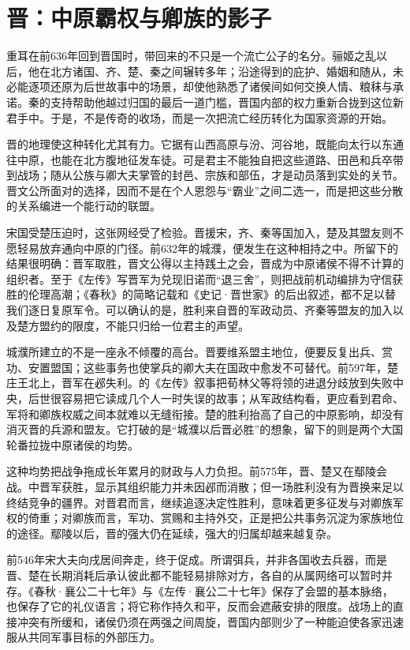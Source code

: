 \section{晋：中原霸权与卿族的影子}

重耳在前636年回到晋国时，带回来的不只是一个流亡公子的名分。骊姬之乱以后，他在北方诸国、齐、楚、秦之间辗转多年；沿途得到的庇护、婚姻和随从，未必能逐项还原为后世故事中的场景，却使他熟悉了诸侯间如何交换人情、粮秣与承诺。秦的支持帮助他越过归国的最后一道门槛，晋国内部的权力重新合拢到这位新君手中。于是，不是传奇的收场，而是一次把流亡经历转化为国家资源的开始。

晋的地理使这种转化尤其有力。它据有山西高原与汾、河谷地，既能向太行以东通往中原，也能在北方腹地征发车徒。可是君主不能独自把这些道路、田邑和兵卒带到战场；随从公族与卿大夫掌管的封邑、宗族和部伍，才是动员落到实处的关节。晋文公所面对的选择，因而不是在个人恩怨与“霸业”之间二选一，而是把这些分散的关系编进一个能行动的联盟。

宋国受楚压迫时，这张网经受了检验。晋援宋，齐、秦等国加入，楚及其盟友则不愿轻易放弃通向中原的门径。前632年的城濮，便发生在这种相持之中。所留下的结果很明确：晋军取胜，晋文公得以主持践土之会，晋成为中原诸侯不得不计算的组织者。至于《左传》写晋军为兑现旧诺而“退三舍”，则把战前机动编排为守信获胜的伦理高潮；《春秋》的简略记载和《史记·晋世家》的后出叙述，都不足以替我们逐日复原军令。可以确认的是，胜利来自晋的军政动员、齐秦等盟友的加入以及楚方盟约的限度，不能只归给一位君主的声望。

城濮所建立的不是一座永不倾覆的高台。晋要维系盟主地位，便要反复出兵、赏功、安置盟国；这些事务也使掌兵的卿大夫在国政中愈发不可替代。前597年，楚庄王北上，晋军在邲失利。的《左传》叙事把荀林父等将领的进退分歧放到失败中央，后世很容易把它读成几个人一时失误的故事；从军政结构看，更应看到君命、军将和卿族权威之间本就难以无缝衔接。楚的胜利抬高了自己的中原影响，却没有消灭晋的兵源和盟友。它打破的是“城濮以后晋必胜”的想象，留下的则是两个大国轮番拉拢中原诸侯的均势。

这种均势把战争拖成长年累月的财政与人力负担。前575年，晋、楚又在鄢陵会战。中晋军获胜，显示其组织能力并未因邲而消散；但一场胜利没有为晋换来足以终结竞争的疆界。对晋君而言，继续追逐决定性胜利，意味着更多征发与对卿族军权的倚重；对卿族而言，军功、赏赐和主持外交，正是把公共事务沉淀为家族地位的途径。鄢陵以后，晋的强大仍在延续，强大的归属却越来越复杂。

前546年宋大夫向戌居间奔走，终于促成。所谓弭兵，并非各国收去兵器，而是晋、楚在长期消耗后承认彼此都不能轻易排除对方，各自的从属网络可以暂时并存。《春秋·襄公二十七年》与《左传·襄公二十七年》保存了会盟的基本脉络，也保存了它的礼仪语言；将它称作持久和平，反而会遮蔽安排的限度。战场上的直接冲突有所缓和，诸侯仍须在两强之间周旋，晋国内部则少了一种能迫使各家迅速服从共同军事目标的外部压力。

